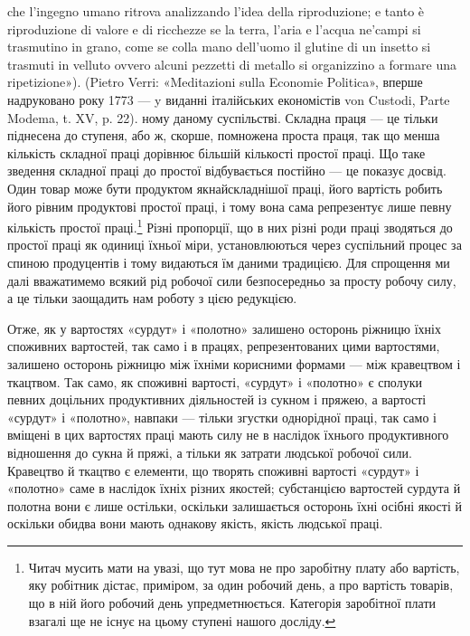 che l’ingegno umano ritrova analizzando l’idea della riproduzione; e tanto
è riproduzione di valore e di ricchezze se la terra, l’aria e l’acqua ne’campi
si trasmutino in grano, come se colla mano dell'uomo il glutine di un insetto
si trasmuti in velluto ovvero alcuni pezzetti di metallo si organizzino a formare
una ripetizione»). (Pietro Verri: «Meditazioni sulla Economie Politica»,
вперше надруковано року 1773 — y виданні італійських економістів
von Custodi, Parte Modema, t. XV, p. 22).
ному даному суспільстві. Складна праця — це тільки піднесена
до ступеня, або ж, скорше, помножена проста праця, так що менша
кількість складної праці дорівнює більшій кількості простої праці.
Що таке зведення складної праці до простої відбувається постійно
— це показує досвід. Один товар може бути продуктом якнайскладнішої
праці, його вартість робить його рівним продуктові
простої праці, і тому вона сама репрезентує лише певну кількість
простої праці.\footnote{
Читач мусить мати на увазі, що тут мова не про заробітну плату
або вартість, яку робітник дістає, приміром, за один робочий день, а про
вартість товарів, що в ній його робочий день упредметнюється. Категорія
заробітної плати взагалі ще не існує на цьому ступені нашого досліду.
} Різні пропорції, що в них різні роди праці зводяться
до простої праці як одиниці їхньої міри, установлюються
через суспільний процес за спиною продуцентів і тому видаються
їм даними традицією. Для спрощення ми далі вважатимемо всякий
рід робочої сили безпосередньо за просту робочу силу, а це
тільки заощадить нам роботу з цією редукцією.

Отже, як у вартостях «сурдут» і «полотно» залишено осторонь
ріжницю їхніх споживних вартостей, так само і в працях,
репрезентованих цими вартостями, залишено осторонь ріжницю
між їхніми корисними формами — між кравецтвом і ткацтвом.
Так само, як споживні вартості, «сурдут» і «полотно» є сполуки
певних доцільних продуктивних діяльностей із сукном і пряжею,
а вартості «сурдут» і «полотно», навпаки — тільки згустки
однорідної праці, так само і вміщені в цих вартостях праці мають
силу не в наслідок їхнього продуктивного відношення до сукна
й пряжі, а тільки як затрати людської робочої сили. Кравецтво
й ткацтво є елементи, що творять споживні вартості «сурдут»
і «полотно» саме в наслідок їхніх різних якостей; субстанцією
вартостей сурдута й полотна вони є лише остільки, оскільки залишається
осторонь їхні осібні якості й оскільки обидва вони мають
однакову якість, якість людської праці.

